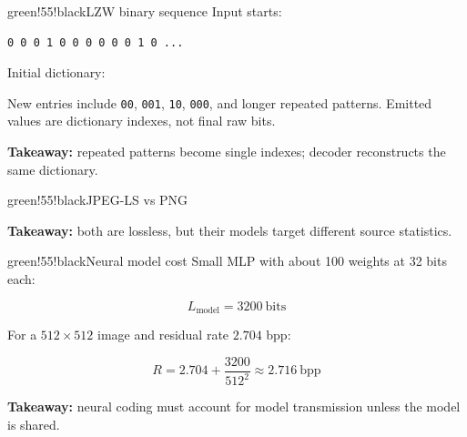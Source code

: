 \begin{calloutbox}{green!55!black}{LZW binary sequence}
Input starts:

\begin{verbatim}
0 0 0 1 0 0 0 0 0 0 1 0 ...
\end{verbatim}

Initial dictionary:

\begin{center}
\end{center}

New entries include \texttt{00}, \texttt{001}, \texttt{10}, \texttt{000}, and longer repeated patterns. Emitted values are dictionary indexes, not final raw bits.

\textbf{Takeaway:} repeated patterns become single indexes; decoder reconstructs the same dictionary.
\end{calloutbox}

\begin{calloutbox}{green!55!black}{JPEG-LS vs PNG}
\begin{center}
\end{center}

\textbf{Takeaway:} both are lossless, but their models target different source statistics.
\end{calloutbox}

\begin{calloutbox}{green!55!black}{Neural model cost}
Small MLP with about 100 weights at 32 bits each:

\[
L_{\text{model}}=3200\ \text{bits}
\]

For a $512\times512$ image and residual rate $2.704$ bpp:

\[
R=2.704+\frac{3200}{512^2}\approx2.716\ \text{bpp}
\]

\textbf{Takeaway:} neural coding must account for model transmission unless the model is shared.
\end{calloutbox}

